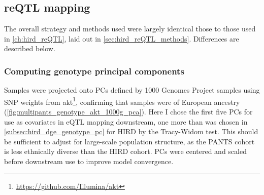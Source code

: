 \subsection{reQTL mapping}

The overall strategy and methods used were largely identical those to those used in \cref{ch:hird_reQTL}, laid out in \cref{sec:hird_reQTL_methods}.
Differences are described below.

\subsubsection{Computing genotype principal components}

Samples were projected onto \glspl{PC} defined by 1000 Genomes Project samples using \gls{SNP} weights from {akt}\footnote{\url{https://github.com/Illumina/akt}},
confirming that samples were of European ancestry (\cref{fig:multipants_genotype_akt_1000g_pca}).
Here I chose the first five \glspl{PC} for use as covariates in \gls{eQTL} mapping downstream, one more than was chosen in \cref{subsec:hird_dge_genotype_pc} for \gls{HIRD} by the Tracy-Widom test.
This should be sufficient to adjust for large-scale population structure, as the \gls{PANTS} cohort is less ethnically diverse than the \gls{HIRD} cohort.
\glspl{PC} were centered and scaled before downstream use to improve model convergence.

